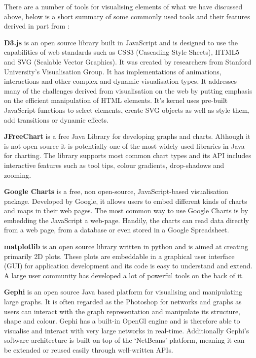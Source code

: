 \documentclass[a4paper,11pt,titlepage]{article}
\begin{document}
	There are a number of tools for visualising elements of what we have discussed above, below is a short summary of some commonly used tools and their features derived in part from \cite{Wang2015}:
	\par 
		\textbf{D3.js} is an open source library built in JavaScript and is designed to use the capabilities of web standards such as CSS3 (Cascading Style Sheets), HTML5 and SVG (Scalable Vector Graphics). It was created by researchers from Stanford University's Visualisation Group. It has implementations of animations, interactions and other  complex and dynamic visualisation types. It addresses many of the challenges derived from visualisation on the web by putting emphasis on the efficient manipulation of HTML elements. It's kernel uses pre-built JavaScript functions to select elements, create SVG objects as well as style them, add transitions or dynamic effects.
		\par
		\textbf{JFreeChart} is a free Java Library for developing graphs and charts. Although it is not open-source it is potentially one of the most widely used libraries in Java for charting. The library supports most common chart types and its API includes interactive features such as tool tips, colour gradients, drop-shadows and zooming. 
		\par 
		\textbf{Google Charts} is a free, non open-source, JavaScript-based visualisation package. Developed by Google, it allows users to embed different kinds of charts and maps in their web pages. The most common way to use Google Charts is by embedding the JavaScript a web-page. Handily, the charts can read data directly from a web page, from a database or even stored in a Google Spreadsheet. 
		\par 
		\textbf{matplotlib}
		is an open source library written in python and is aimed at creating primarily 2D plots. These plots are embeddable in a graphical user interface (GUI) for application development and its code is easy to understand and extend. A large user community has developed a lot of powerful tools on the back of it.
		\par 
		\textbf{Gephi}
		is an open source Java based platform for visualising and manipulating large graphs. It is often regarded as the Photoshop for networks and graphs as users can interact with the graph representation and manipulate its structure, shape and colour. Gephi has a built-in OpenGl engine and is therefore able to visualise and interact with very large networks in real-time. Additionally Gephi's software architecture is built on top of the `NetBeans' platform, meaning it can be extended or reused easily through well-written APIs.
\end{document}
